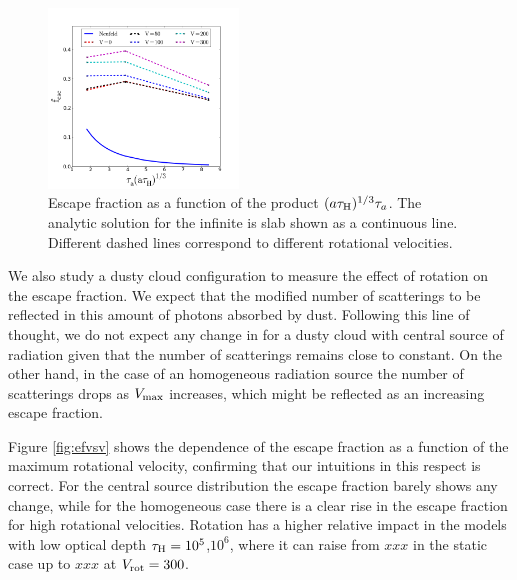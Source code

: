\documentclass[usenatbib]{mn2e}
\newcommand{\ly}{{\ifmmode{{\rm Ly}\alpha~}\else{Ly$\alpha$~}\fi}}
\newcommand{\kms}{{\ifmmode{{\mathrm{\,km\ s}^{-1}}}\else{\,km~s$^{-1}$}\fi}}
\begin{document}
\begin{figure}
  \includegraphics[width=0.45\textwidth]{Neufeld.png}
 \caption{Escape fraction as a function of the
   product $(a\tau_{\rm H})^{1/3}\tau_{a}$. The analytic solution for
   the infinite is slab shown as a continuous line. Different dashed
   lines correspond to different rotational velocities.
   \label{fig:efvsNeufeld}}   
\end{figure}

We also study a dusty cloud configuration to measure the effect of
rotation on the escape fraction. We expect that the modified number of
scatterings to be reflected in this amount of photons absorbed by
dust. Following this line of thought,  we do not expect any change in
for a dusty cloud with central source of radiation given that the
number of scatterings remains close to constant. On the other hand, in
the case of an homogeneous radiation source the number of scatterings
drops as $V_{\rm max}$ increases, which might be reflected as an
increasing escape fraction.



Figure \ref{fig:efvsv} shows the dependence of the escape fraction as
a function of the maximum rotational velocity, confirming that our
intuitions in this respect is correct. For the central source
distribution the escape fraction barely shows any change, while for
the homogeneous case there is a clear rise in the escape fraction for
high rotational velocities.  Rotation has a higher relative impact in
the models with low optical depth $\tau_{\rm H}=10^5$,$10^{6}$, where
it can raise from $xxx$ in the static case up to $xxx$ at $V_{\rm
  rot}=300$\kms. 
\end{document}
